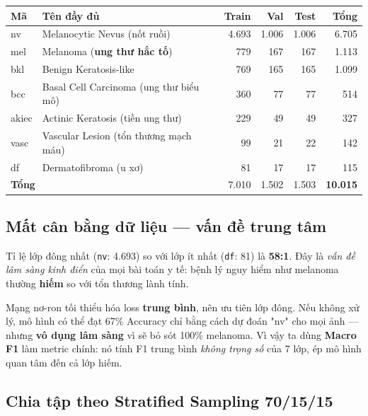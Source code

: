 \documentclass[11pt,a4paper]{article}
\begin{document}
\begin{table}[h]
\centering\small
\begin{tabular}{llrrrr}
\toprule
\textbf{Mã} & \textbf{Tên đầy đủ} & \textbf{Train} & \textbf{Val} & \textbf{Test} & \textbf{Tổng} \\
\midrule
nv     & Melanocytic Nevus (nốt ruồi)           & 4.693 & 1.006 & 1.006 & 6.705 \\
mel    & Melanoma (\textbf{ung thư hắc tố})     &   779 &   167 &   167 & 1.113 \\
bkl    & Benign Keratosis-like                  &   769 &   165 &   165 & 1.099 \\
bcc    & Basal Cell Carcinoma (ung thư biểu mô) &   360 &    77 &    77 &   514 \\
akiec  & Actinic Keratosis (tiền ung thư)       &   229 &    49 &    49 &   327 \\
vasc   & Vascular Lesion (tổn thương mạch máu)  &    99 &    21 &    22 &   142 \\
df     & Dermatofibroma (u xơ)                  &    81 &    17 &    17 &   115 \\
\midrule
\multicolumn{2}{l}{\textbf{Tổng}}                & 7.010 & 1.502 & 1.503 & \textbf{10.015} \\
\bottomrule
\end{tabular}
\end{table}

\subsection{Mất cân bằng dữ liệu --- vấn đề trung tâm}

Tỉ lệ lớp đông nhất (\texttt{nv}: 4.693) so với lớp ít nhất (\texttt{df}: 81) là \textbf{58:1}. Đây là \textit{vấn đề lâm sàng kinh điển} của mọi bài toán y tế: bệnh lý nguy hiểm như melanoma thường \textbf{hiếm} so với tổn thương lành tính.

\begin{idea}
Mạng nơ-ron tối thiểu hóa loss \textbf{trung bình}, nên ưu tiên lớp đông. Nếu không xử lý, mô hình có thể đạt 67\% Accuracy chỉ bằng cách dự đoán "nv" cho mọi ảnh --- nhưng \textbf{vô dụng lâm sàng} vì sẽ bỏ sót 100\% melanoma. Vì vậy ta dùng \textbf{Macro F1} làm metric chính: nó tính F1 trung bình \textit{không trọng số} của 7 lớp, ép mô hình quan tâm đến cả lớp hiếm.
\end{idea}

\subsection{Chia tập theo Stratified Sampling 70/15/15}
\end{document}
